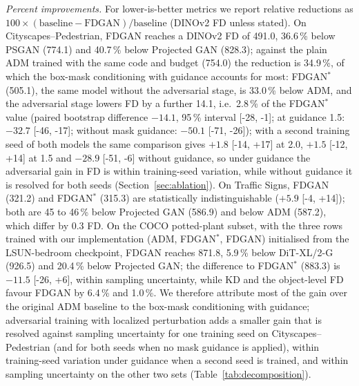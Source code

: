 
\noindent\emph{Percent improvements.} For lower-is-better metrics we report relative reductions as $100\times(\text{baseline}-\text{FDGAN})/\text{baseline}$ (DINOv2 FD unless stated). On Cityscapes--Pedestrian, FDGAN reaches a DINOv2 FD of 491.0, 36.6\,\% below PSGAN (774.1) and 40.7\,\% below Projected GAN (828.3); against the plain ADM trained with the same code and budget (754.0) the reduction is 34.9\,\%, of which the box-mask conditioning with guidance accounts for most: FDGAN$^{\ast}$ (505.1), the same model without the adversarial stage, is 33.0\,\% below ADM, and the adversarial stage lowers FD by a further 14.1, i.e.\ 2.8\,\% of the FDGAN$^{\ast}$ value (paired bootstrap difference $-14.1$, 95\,\% interval [-28, -1]; at guidance 1.5: $-32.7$ [-46, -17]; without mask guidance: $-50.1$ [-71, -26]); with a second training seed of both models the same comparison gives $+1.8$ [-14, +17] at 2.0, $+1.5$ [-12, +14] at 1.5 and $-28.9$ [-51, -6] without guidance, so under guidance the adversarial gain in FD is within training-seed variation, while without guidance it is resolved for both seeds (Section~\ref{sec:ablation}). On Traffic Signs, FDGAN (321.2) and FDGAN$^{\ast}$ (315.3) are statistically indistinguishable ($+5.9$ [-4, +14]); both are 45 to 46\,\% below Projected GAN (586.9) and below ADM (587.2), which differ by 0.3 FD. On the COCO potted-plant subset, with the three rows trained with our implementation (ADM, FDGAN$^{\ast}$, FDGAN) initialised from the LSUN-bedroom checkpoint, FDGAN reaches 871.8, 5.9\,\% below DiT-XL/2-G (926.5) and 20.4\,\% below Projected GAN; the difference to FDGAN$^{\ast}$ (883.3) is $-11.5$ [-26, +6], within sampling uncertainty, while KD and the object-level FD favour FDGAN by 6.4\,\% and 1.0\,\%. We therefore attribute most of the gain over the original ADM baseline to the box-mask conditioning with guidance; adversarial training with localized perturbation adds a smaller gain that is resolved against sampling uncertainty for one training seed on Cityscapes--Pedestrian (and for both seeds when no mask guidance is applied), within training-seed variation under guidance when a second seed is trained, and within sampling uncertainty on the other two sets (Table~\ref{tab:decomposition}).
